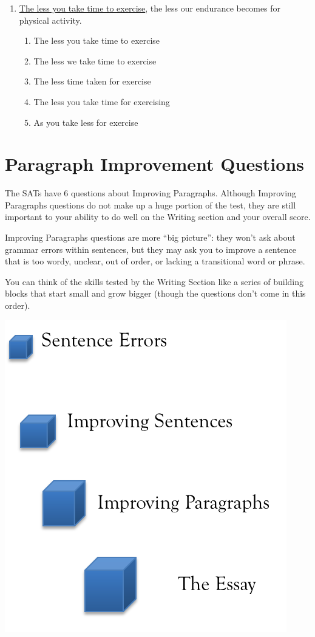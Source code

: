 \begin{enumerate}
\bigskip
\item \underline{The less you take time to exercise}, the less our endurance becomes for physical activity.
\begin{enumerate}[label=(\Alph*)]
\item The less you take time to exercise
\item The less we take time to exercise
\item The less time taken for exercise
\item The less you take time for exercising
\item As you take less for exercise
\end{enumerate}
\end{enumerate}

\newpage

\section[Paragraph Improvement]{Paragraph Improvement Questions}
The SATs have 6 questions about Improving Paragraphs. Although Improving Paragraphs questions do not make up a huge portion of the test, they are still important to your ability to do well on the Writing section and your overall score.  

\bigskip
Improving Paragraphs questions are more “big picture”: they won't ask about grammar errors within sentences, but they may ask you to improve a sentence that is too wordy, unclear, out of order, or lacking a transitional word or phrase.

\bigskip
You can think of the skills tested by the Writing Section like a series of building blocks that start small and grow bigger (though the questions don't come in this order). 

\begin{center}
\includegraphics{Essay}
 
\end{center}


